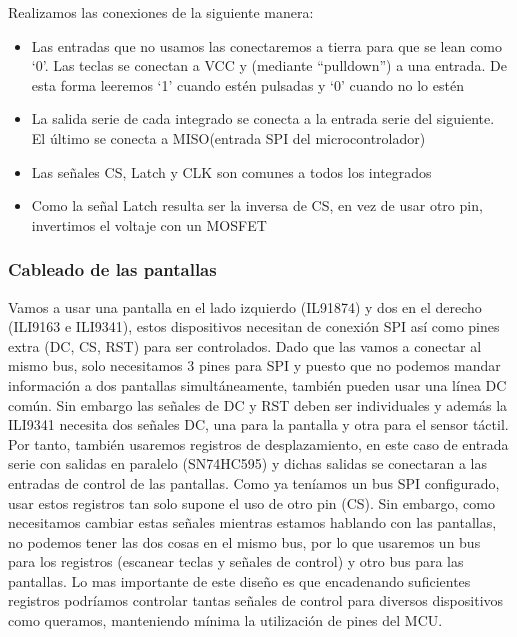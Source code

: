     Realizamos las conexiones de la siguiente manera:
    \begin{itemize}
        \item Las entradas que no usamos las conectaremos a tierra para que se lean como `0'. Las teclas se conectan a VCC y (mediante ``pulldown'') a una entrada. De esta forma leeremos `1' cuando estén     pulsadas y `0' cuando no lo estén 
        \item La salida serie de cada integrado se conecta a la entrada serie del siguiente. El último se conecta a MISO(entrada SPI del microcontrolador)
        \item Las señales CS, Latch y CLK son comunes a todos los integrados
        \item Como la señal Latch resulta ser la inversa de CS, en vez de usar otro pin, invertimos el voltaje con un MOSFET
    \end{itemize}
    


    \subsubsection{Cableado de las pantallas}
    Vamos a usar una pantalla en el lado izquierdo (IL91874) y dos en el derecho (ILI9163 e ILI9341), estos dispositivos necesitan de conexión SPI así como pines extra (DC, CS, RST) para ser controlados. Dado que las vamos a conectar al mismo bus, solo necesitamos 3 pines para SPI y puesto que no podemos mandar información a dos pantallas simultáneamente, también pueden usar una línea DC común. \newline
    Sin embargo las señales de DC y RST deben ser individuales y además la ILI9341 necesita dos señales DC, una para la pantalla y otra para el sensor táctil. Por tanto, también usaremos registros de desplazamiento, en este caso de entrada serie con salidas en paralelo (SN74HC595) y dichas salidas se conectaran a las entradas de control de las pantallas. \newline
    Como ya teníamos un bus SPI configurado, usar estos registros tan solo supone el uso de otro pin (CS). Sin embargo, como necesitamos cambiar estas señales mientras estamos hablando con las pantallas, no podemos tener las dos cosas en el mismo bus, por lo que usaremos un bus para los registros (escanear teclas y señales de control) y otro bus para las pantallas. Lo mas importante de este diseño es que encadenando suficientes registros podríamos controlar tantas señales de control para diversos dispositivos como queramos, manteniendo mínima la utilización de pines del MCU. 

